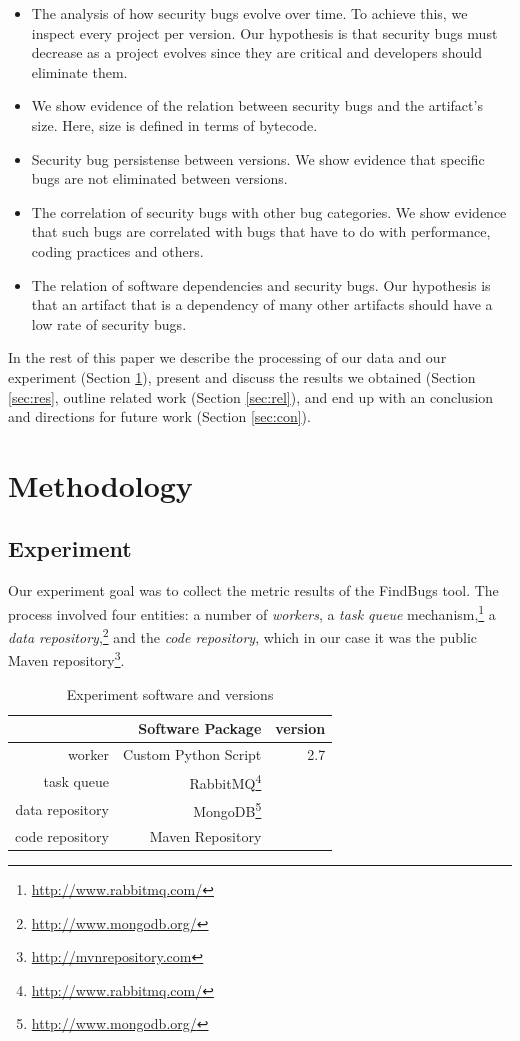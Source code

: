 \documentclass[conference]{IEEEtran}
\begin{document}
\begin{itemize}
	\item The analysis of how security bugs evolve over time. To achieve
this, we inspect every project per version. Our hypothesis is that security
bugs must decrease as a project evolves since they are critical and developers
should eliminate them.
	\item We show evidence of the relation between security bugs and the artifact's size.  Here, size is
defined in terms of bytecode.
	\item Security bug persistense between versions. We show evidence that specific bugs are
not eliminated between versions.
	\item The correlation of security bugs with other bug categories. We
show evidence that such bugs are correlated with bugs that have to do with
performance, coding practices and others.
	\item The relation of software dependencies and security bugs. Our
hypothesis is that an artifact that is a dependency of many other artifacts
should have a low rate of security bugs. 
\end{itemize}

In the rest of this paper we
describe the processing of our data and our experiment (Section \ref{sec:meth}),
present and discuss the results we obtained (Section \ref{sec:res},
outline related work (Section \ref{sec:rel}),
and end up with an conclusion and directions for future work (Section \ref{sec:con}).

\section{Methodology}
\label{sec:meth}

\subsection{Experiment}
\label{sec:exp}

Our experiment goal was to collect the metric results of the FindBugs tool.
The process involved four entities: a number of {\it workers}, a
{\it task queue} mechanism,\footnote{\url{http://www.rabbitmq.com/}}
a {\it data repository},\footnote{\url{http://www.mongodb.org/}}
and the {\it code repository}, which in our case it was the public Maven 
repository\footnote{\url{http://mvnrepository.com}}.

\begin{table}
\centering
\caption{Experiment software and versions}
\label{tbl:soft-version}
\begin{tabular}{r r r}
\hline
 & Software Package & version\\
 \hline
worker & Custom Python Script & 2.7\\
task queue & RabbitMQ\footnote{\url{http://www.rabbitmq.com/}} & \\
data repository & MongoDB\footnote{\url{http://www.mongodb.org/}} & \\
code repository & Maven Repository & \\
\hline
\end{tabular}
\end{table}
\end{document}
